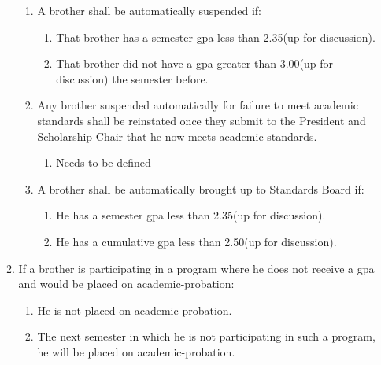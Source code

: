 \begin{enumerate}
\begin{enumerate}
\begin{enumerate}
				\item A brother shall be automatically suspended if:
				\begin{enumerate}
					\item That brother has a semester \gls{gpa} less than 2.35(up for discussion).
					\item That brother did not have a \gls{gpa} greater than 3.00(up for discussion) the semester before.
				\end{enumerate}
				\item Any brother suspended automatically for failure to meet academic standards shall be reinstated once they submit to the President and Scholarship Chair that he now meets academic standards.
				\begin{enumerate}
					\item Needs to be defined
				\end{enumerate}
				\item A brother shall be automatically brought up to Standards Board if:
				\begin{enumerate}
					\item He has a semester \gls{gpa} less than 2.35(up for discussion).
					\item He has a cumulative \gls{gpa} less than 2.50(up for discussion).
				\end{enumerate}
			\end{enumerate}

		\item If a brother is participating in a program where he does not receive a \gls{gpa} and would be placed on \gls{academic-probation}:
			\begin{enumerate}
				\item He is not placed on \gls{academic-probation}.
				\item The next semester in which he is not participating in such a program, he will be placed on \gls{academic-probation}.
			\end{enumerate}

		\end{enumerate}
	\end{enumerate}


